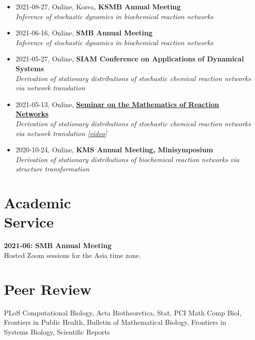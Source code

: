 \documentclass[margin,line]{res}
\newcommand{\vspacesection}{\vspace*{-1.5mm}}
\begin{document}
\begin{resume}
\begin{itemize}[leftmargin=0pt, label={}]
    \item 2021-08-27, Online, Korea, \textbf{KSMB Annual Meeting} \\
    \textit{Inference of stochastic dynamics in biochemical reaction networks}
    \item 2021-06-16, Online, \textbf{SMB Annual Meeting} \\
    \textit{Inference of stochastic dynamics in biochemical reaction networks}
    \item 2021-05-27, Online, \textbf{SIAM Conference on Applications of Dynamical Systems} \\
    \textit{Derivation of stationary distributions of stochastic chemical reaction networks via network translation}
    \item 2021-05-13, Online, \href{https://researchseminars.org/seminar/MoRN}{\textbf{Seminar on the Mathematics of Reaction Networks}} \\
    \textit{Derivation of stationary distributions of stochastic chemical reaction networks via network translation [\href{https://www.youtube.com/watch?v=KC7gRxCBmnc&ab_channel=MathematicsofReactionNetworks}{\ul{video}}]}
    \item 2020-10-24, Online, \textbf{KMS Annual Meeting, Minisymposium} \\
    \textit{Derivation of stationary distributions of biochemical reaction networks via structure transformation}
\end{itemize}
\vspacesection
\section{\sc Academic \\ Service}
\textbf{2021-06: SMB Annual Meeting} \\
Hosted Zoom sessions for the Asia time zone.
\vspace{-5pt}

\section{\sc Peer Review}
PLoS Computational Biology, Acta Biotheoretica, Stat, PCI Math Comp Biol, Frontiers in Public Health, Bulletin of Mathematical Biology, Frontiers in Systems Biology, Scientific Reports
\vspace{-8pt}


\end{resume}
\end{document}
